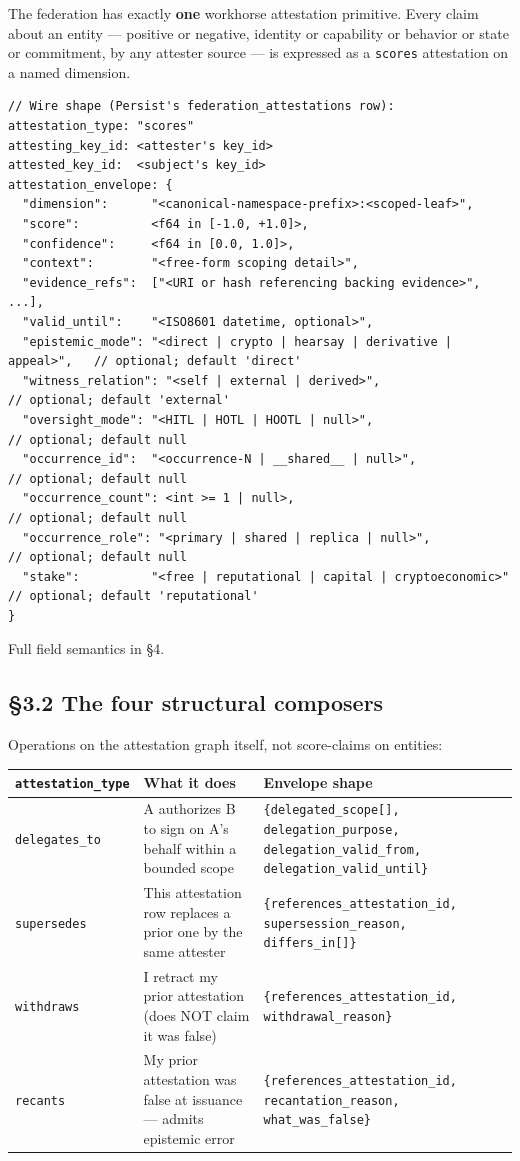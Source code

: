 \documentclass[10pt]{article}
\begin{document}
The federation has exactly \textbf{one} workhorse attestation primitive. Every claim about an entity — positive or negative, identity or capability or behavior or state or commitment, by any attester source — is expressed as a \texttt{scores} attestation on a named dimension.


\begin{lstlisting}
// Wire shape (Persist's federation_attestations row):
attestation_type: "scores"
attesting_key_id: <attester's key_id>
attested_key_id:  <subject's key_id>
attestation_envelope: {
  "dimension":      "<canonical-namespace-prefix>:<scoped-leaf>",
  "score":          <f64 in [-1.0, +1.0]>,
  "confidence":     <f64 in [0.0, 1.0]>,
  "context":        "<free-form scoping detail>",
  "evidence_refs":  ["<URI or hash referencing backing evidence>", ...],
  "valid_until":    "<ISO8601 datetime, optional>",
  "epistemic_mode": "<direct | crypto | hearsay | derivative | appeal>",   // optional; default 'direct'
  "witness_relation": "<self | external | derived>",                       // optional; default 'external'
  "oversight_mode": "<HITL | HOTL | HOOTL | null>",                        // optional; default null
  "occurrence_id":  "<occurrence-N | __shared__ | null>",                  // optional; default null
  "occurrence_count": <int >= 1 | null>,                                    // optional; default null
  "occurrence_role": "<primary | shared | replica | null>",                // optional; default null
  "stake":          "<free | reputational | capital | cryptoeconomic>"     // optional; default 'reputational'
}
\end{lstlisting}

Full field semantics in §4.


\subsection*{§3.2 The four structural composers}


Operations on the attestation graph itself, not score-claims on entities:


{\footnotesize
\begin{longtable}{|p{5.33cm}|p{5.33cm}|p{5.33cm}|}\hline
\textbf{\texttt{attestation\_type}} & \textbf{What it does} & \textbf{Envelope shape} \\ \hline\endhead
\texttt{delegates\_to} & A authorizes B to sign on A's behalf within a bounded scope & \texttt{\{delegated\_scope[], delegation\_purpose, delegation\_valid\_from, delegation\_valid\_until\}} \\ \hline
\texttt{supersedes} & This attestation row replaces a prior one by the same attester & \texttt{\{references\_attestation\_id, supersession\_reason, differs\_in[]\}} \\ \hline
\texttt{withdraws} & I retract my prior attestation (does NOT claim it was false) & \texttt{\{references\_attestation\_id, withdrawal\_reason\}} \\ \hline
\texttt{recants} & My prior attestation was false at issuance — admits epistemic error & \texttt{\{references\_attestation\_id, recantation\_reason, what\_was\_false\}} \\ \hline
\end{longtable}}
\end{document}
